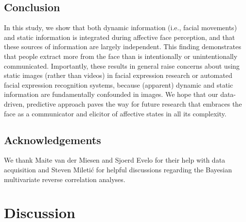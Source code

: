 \documentclass[11pt,american,]{memoir} %
\begin{document}
\hypertarget{svsd-conclusion}{%
\section{Conclusion}\label{svsd-conclusion}}

In this study, we show that both dynamic information (i.e., facial movements) and static information is integrated during affective face perception, and that these sources of information are largely independent. This finding demonstrates that people extract more from the face than is intentionally or unintentionally communicated. Importantly, these results in general raise concerns about using static images (rather than videos) in facial expression research or automated facial expression recognition systems, because (apparent) dynamic and static information are fundamentally confounded in images. We hope that our data-driven, predictive approach paves the way for future research that embraces the face as a communicator and elicitor of affective states in all its complexity.

\hypertarget{acknowledgements}{%
\section{Acknowledgements}\label{acknowledgements}}

We thank Maite van der Miesen and Sjoerd Evelo for their help with data acquisition and
Steven Miletić for helpful discussions regarding the Bayesian multivariate reverse correlation analyses.

\hypertarget{general-discussion}{%
\chapter{Discussion}\label{general-discussion}}
\end{document}
